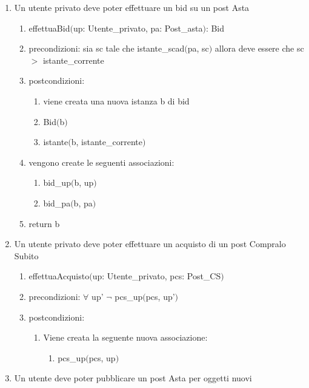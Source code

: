 \documentclass{article}
\begin{document}
\begin{enumerate}
    \item\label{sec:effettuaBid} Un utente privato deve poter effettuare un bid su un post Asta
    \begin{enumerate}
        \item effettuaBid$($up: Utente\_privato, pa: Post\_asta$)$: Bid
        \item precondizioni: sia sc tale che istante\_scad$($pa, sc$)$ allora deve essere che sc $>$ istante\_corrente
        \item postcondizioni: 
        \begin{enumerate}
            \item viene creata una nuova istanza b di bid
            \item Bid$($b$)$
            \item istante$($b, istante\_corrente$)$
        \end{enumerate}
        \item vengono create le seguenti associazioni:
        \begin{enumerate}
            \item bid\_up$($b, up$)$
            \item bid\_pa$($b, pa$)$
        \end{enumerate}
        \item return b
    \end{enumerate}
    \newpage
    \item\label{sec:effettuaAcquisto} Un utente privato deve poter effettuare un acquisto di un post Compralo Subito
    \begin{enumerate}
        \item effettuaAcquisto$($up: Utente\_privato, pcs: Post\_CS$)$
        \item precondizioni: $\forall$ up' $\neg$ pcs\_up$($pcs, up'$)$
        \item postcondizioni:
        \begin{enumerate}
            \item Viene creata la seguente nuova associazione:
            \begin{enumerate}
                \item pcs\_up$($pcs, up$)$
            \end{enumerate}
        \end{enumerate}
    \end{enumerate}
    \newpage
    \item\label{sec:pubblicaPostAstaNuovo} Un utente deve poter pubblicare un post Asta per oggetti nuovi

\end{enumerate}
\end{document}
